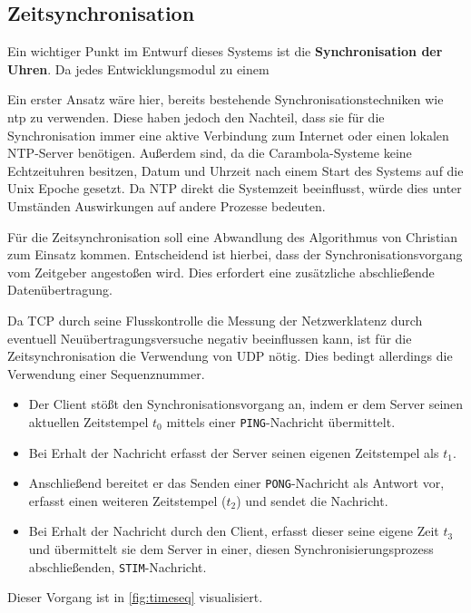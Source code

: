 \subsection{Zeitsynchronisation}\label{subs:time}
Ein wichtiger Punkt im Entwurf dieses Systems ist die \textbf{Synchronisation
der Uhren}. Da jedes Entwicklungsmodul zu einem

Ein erster Ansatz wäre hier, bereits bestehende Synchronisationstechniken wie
\gls{ntp} zu verwenden. Diese haben jedoch den Nachteil, dass sie für die
Synchronisation immer eine aktive Verbindung zum Internet oder einen lokalen
NTP-Server  benötigen. Außerdem sind, da die Carambola-Systeme keine
Echtzeituhren besitzen, Datum und Uhrzeit nach einem Start des Systems auf die
Unix Epoche gesetzt. Da NTP direkt die Systemzeit beeinflusst, würde dies 
unter Umständen Auswirkungen auf andere Prozesse bedeuten.

Für die Zeitsynchronisation soll eine Abwandlung des Algorithmus von Christian
zum Einsatz kommen. Entscheidend ist hierbei, dass der Synchronisationsvorgang
vom Zeitgeber angestoßen wird. Dies erfordert eine zusätzliche
abschließende Datenübertragung.

Da TCP durch seine Flusskontrolle die Messung der Netzwerklatenz
durch eventuell Neuübertragungsversuche negativ beeinflussen kann, ist für die
Zeitsynchronisation die Verwendung von UDP nötig. Dies bedingt allerdings die
Verwendung einer Sequenznummer.

\begin{itemize}
  \item Der Client stößt den Synchronisationsvorgang an, indem er dem Server
  seinen aktuellen Zeitstempel $t_0$ mittels einer \texttt{PING}-Nachricht
  übermittelt.
  \item Bei Erhalt der Nachricht erfasst der Server seinen eigenen Zeitstempel
  als $t_1$.
  \item Anschließend bereitet er das Senden einer \texttt{PONG}-Nachricht als
  Antwort vor, erfasst einen weiteren Zeitstempel ($t_2$) und sendet die
  Nachricht.
  \item Bei Erhalt der Nachricht durch den Client, erfasst dieser seine eigene
  Zeit $t_3$ und übermittelt sie dem Server in einer, diesen
  Synchronisierungsprozess abschließenden, \texttt{STIM}-Nachricht.
\end{itemize} 
Dieser Vorgang ist in \autoref{fig:timeseq} visualisiert.

